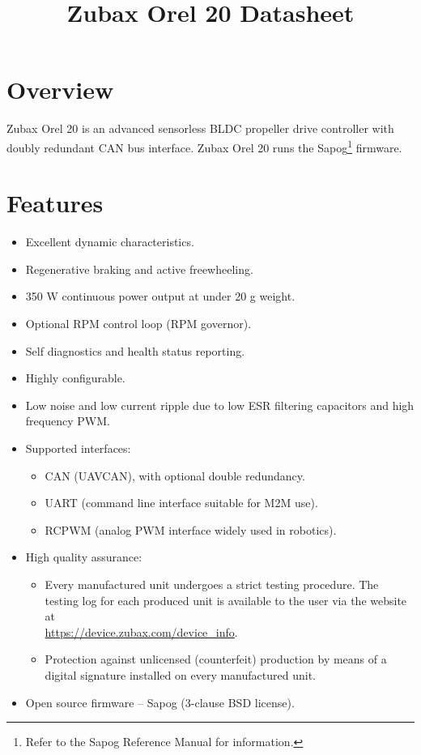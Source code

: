 \documentclass{zubaxdoc}
\title{Zubax Orel 20 Datasheet}
\begin{document}
\frontmatter

\begin{titlepage}

\section*{Overview}

Zubax Orel 20 is an advanced sensorless BLDC propeller drive controller with doubly redundant CAN bus interface.
Zubax Orel 20 runs the Sapog\footnote{Refer to the Sapog Reference Manual for information.}
firmware.

\section*{Features}

\begin{itemize}
    \item Excellent dynamic characteristics.
    \item Regenerative braking and active freewheeling.
    \item 350 W continuous power output at under 20 g weight.
    \item Optional RPM control loop (RPM governor).
    \item Self diagnostics and health status reporting.
    \item Highly configurable.
    \item Low noise and low current ripple due to low ESR filtering capacitors and high frequency PWM.
    \item Supported interfaces:
    \begin{itemize}
        \item CAN (UAVCAN), with optional double redundancy.
        \item UART (command line interface suitable for M2M use).
        \item RCPWM (analog PWM interface widely used in robotics).
    \end{itemize}
    \item High quality assurance:
    \begin{itemize}
        \item Every manufactured unit undergoes a strict testing procedure.
        The testing log for each produced unit is available to the user via the website at\\
        \url{https://device.zubax.com/device_info}.
        \item Protection against unlicensed (counterfeit) production by means of a digital signature
        installed on every manufactured unit.
    \end{itemize}
    \item Open source firmware -- Sapog (3-clause BSD license).
\end{itemize}


\end{titlepage}
\end{document}
